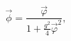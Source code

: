 \begin{equation}
\vec{\phi}=\frac{\vec{\varphi}}{1+\frac{g^2}{4}{\vec{\varphi}}^2},\label{coordinatetr}
\end{equation}


